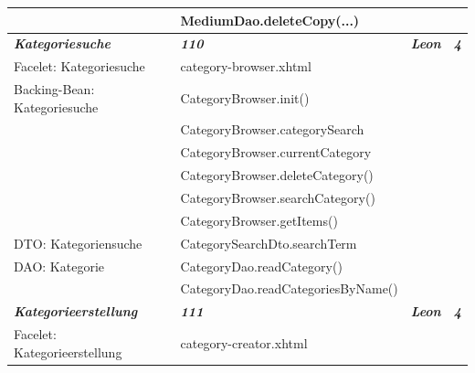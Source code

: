 \documentclass{article}
\begin{document}
\begin{longtable}{|l|l|l|l|}
\hline
                                        & MediumDao.deleteCopy(...)                &                             &                        \\ 
\hline
\textbf{\textit{Kategoriesuche}}        & \textbf{\textit{110}}                    & \textbf{\textit{Leon}}      & \textbf{\textit{4}}    \\ 
\hline
Facelet: Kategoriesuche                 & category-browser.xhtml                   &                             &                        \\ 
\hline
Backing-Bean: Kategoriesuche            & CategoryBrowser.init()                   &                             &                        \\ 
\hline
                                        & CategoryBrowser.categorySearch           &                             &                        \\ 
\hline
                                        & CategoryBrowser.currentCategory          &                             &                        \\ 
\hline
                                        & CategoryBrowser.deleteCategory()         &                             &                        \\ 
\hline
                                        & CategoryBrowser.searchCategory()         &                             &                        \\ 
\hline
                                        & CategoryBrowser.getItems()               &                             &                        \\ 
\hline
DTO: Kategoriensuche                    & CategorySearchDto.searchTerm             &                             &                        \\ 
\hline
DAO: Kategorie                          & CategoryDao.readCategory()               &                             &                        \\ 
\hline
                                        & CategoryDao.readCategoriesByName()       &                             &                        \\ 
\hline
\textbf{\textit{Kategorieerstellung}}   & \textbf{\textit{111}}                    & \textbf{\textit{Leon}}      & \textbf{\textit{4}}    \\ 
\hline
Facelet: Kategorieerstellung            & category-creator.xhtml                   &                             &                        \\ 

\end{longtable}
\end{document}
